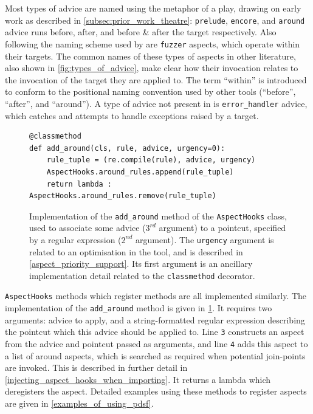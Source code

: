 Most types of advice are named using the metaphor of a play, drawing on early
\theatreag{} work as described in \cref{subsec:prior_work_theatre}:
\lstinline{prelude}, \lstinline{encore}, and \lstinline{around} advice runs
before, after, and before \& after the target respectively. Also following the
naming scheme used by \pydysofu{} are \lstinline{fuzzer}
aspects, which operate within their targets. The common names of these types of
aspects in other literature, also shown in \cref{fig:types_of_advice}, make
clear how their invocation relates to the invocation of the target they are
applied to. The term ``within'' is introduced to conform to the positional
naming convention used by other tools (``before'', ``after'', and ``around''). A
type of advice not present in \pydysofu{} is
\lstinline{error_handler} advice, which catches and attempts to handle
exceptions raised by a target.

\begin{figure}
    \begin{lstlisting}[style=footnotesize_python]
@classmethod
def add_around(cls, rule, advice, urgency=0):
    rule_tuple = (re.compile(rule), advice, urgency)
    AspectHooks.around_rules.append(rule_tuple)
    return lambda : AspectHooks.around_rules.remove(rule_tuple)
    \end{lstlisting}
    \caption{Implementation of the \lstinline{add_around} method of the
    \lstinline{AspectHooks} class, used to associate some advice ($3^{rd}$
    argument) to a pointcut, specified by a regular expression ($2^{nd}$
    argument). The \lstinline{urgency} argument is related to an optimisation
    in the tool, and is described in \cref{aspect_priority_support}. Its first
    argument is an ancillary implementation detail related to the
    \lstinline{classmethod} decorator.}
    \label{fig:add_around_impl}
\end{figure}


\lstinline{AspectHooks} methods which register methods are all implemented
similarly. The implementation of the \lstinline{add_around} method is given in
\cref{fig:add_around_impl}. It requires two arguments: advice to apply, and a
string-formatted regular expression describing the pointcut which this advice
should be applied to. Line \texttt{3} constructs an aspect from the advice and
pointcut passed as arguments, and line \texttt{4} adds this aspect to a list of
around aspects, which is searched as required when potential join-points are
invoked. This is described in further detail in
\cref{injecting_aspect_hooks_when_importing}. It returns a lambda which
deregisters the aspect. Detailed examples using these methods to register
aspects are given in \cref{examples_of_using_pdsf}.


